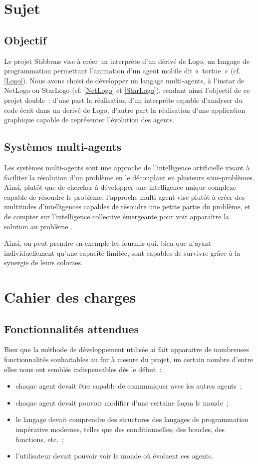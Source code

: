 \section{Sujet}
	\subsection{Objectif}
	Le projet Stibbons vise à créer un interprète d'un dérivé de Logo, un langage de programmation permettant l'animation d'un agent mobile dit «~tortue~» (cf. \ref{Logo}). Nous avons choisi de développer un langage multi-agents, à l'instar de NetLogo ou StarLogo (cf. \ref{NetLogo} et \ref{StarLogo}), rendant ainsi l'objectif de ce projet double~: d'une part la réalisation d'un interprète capable d'analyser du code écrit dans un derivé de Logo, d'autre part la réalisation d'une application graphique capable de représenter l'évolution des agents.

	\subsection{Systèmes multi-agents}
	Les systèmes multi-agents sont une approche de l'intelligence artificielle visant à faciliter la résolution d'un problème en le découplant en plusieurs sous-problèmes. Ainsi, plutôt que de chercher à développer une intelligence unique complexe capable de résoudre le problème, l'approche multi-agent vise plutôt à créer des multitudes d'intelligences capables de résoudre une petite partie du problème, et de compter sur l'intelligence collective émergeante pour voir apparaître la solution au problème \cite{sma}.

	Ainsi, on peut prendre en exemple les fourmis qui, bien que n'ayant individuellement qu'une capacité limitée, sont capables de survivre grâce à la synergie de leurs colonies.

\section{Cahier des charges}
	\subsection{Fonctionnalités attendues}
	Bien que la méthode de développement utilisée ai fait apparaitre de nombreuses fonctionnalités souhaitables au fur à mesure du projet, un certain nombre d'entre elles nous ont semblés indispensables dès le début~:
	\begin{itemize}
		\item chaque agent devait être capable de communiquer avec les autres agents~;
		\item chaque agent devait pouvoir modifier d'une certaine façon le monde~;
		\item le langage devait comprendre des structures des langages de programmation impérative modernes, telles que des conditionnelles, des boucles, des fonctions, etc.~;
		\item l'utilisateur devait pouvoir voir le monde où évoluent ces agents.
	\end{itemize}

